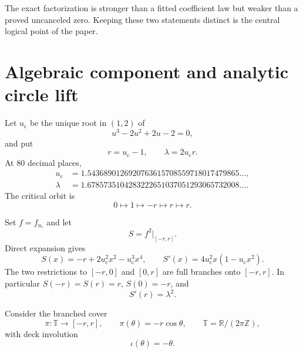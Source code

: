 \documentclass[11pt]{article}
\theoremstyle{definition}
\theoremstyle{remark}
\newcommand{\R}{\mathbb R}
\newcommand{\T}{\mathbb T}
\newcommand{\uc}{u_{\mathrm c}}
\begin{document}
The exact factorization is stronger than a fitted coefficient law but weaker
than a proved uncanceled zero.  Keeping these two statements distinct is the
central logical point of the paper.

\section{Algebraic component and analytic circle lift}
\label{sec:lift}

Let $\uc$ be the unique root in $(1,2)$ of
\begin{equation}\label{eq:cubic}
 u^3-2u^2+2u-2=0,
\end{equation}
and put
\begin{equation}\label{eq:constants}
 r=\uc-1,
 \qquad
 \lambda=2\uc r.
\end{equation}
At 80 decimal places,
\begin{align}
 \uc&=1.5436890126920763615708559718017479865\ldots,\nonumber\\
 \lambda&=1.6785735104283222651037051293065732008\ldots.
 \label{eq:constants-numerical}
\end{align}
The critical orbit is
\begin{equation}\label{eq:critical-orbit}
 0\longmapsto1\longmapsto-r\longmapsto r\longmapsto r.
\end{equation}

Set $f=f_{\uc}$ and let
\begin{equation}\label{eq:S-definition}
 S=f^2|_{[-r,r]}.
\end{equation}
Direct expansion gives
\begin{equation}\label{eq:S-polynomial}
 S(x)=-r+2\uc^2x^2-\uc^3x^4,
 \qquad
 S'(x)=4\uc^2x(1-\uc x^2).
\end{equation}
The two restrictions to $[-r,0]$ and $[0,r]$ are full branches onto
$[-r,r]$.  In particular $S(-r)=S(r)=r$, $S(0)=-r$, and
\begin{equation}\label{eq:endpoint-multiplier}
 S'(r)=\lambda^2.
\end{equation}

Consider the branched cover
\begin{equation}\label{eq:pi}
 \pi:\T\longrightarrow[-r,r],
 \qquad
 \pi(\theta)=-r\cos\theta,
 \qquad
 \T=\R/(2\pi\mathbb Z),
\end{equation}
with deck involution
\begin{equation}\label{eq:iota}
 \iota(\theta)=-\theta.
\end{equation}
\end{document}
